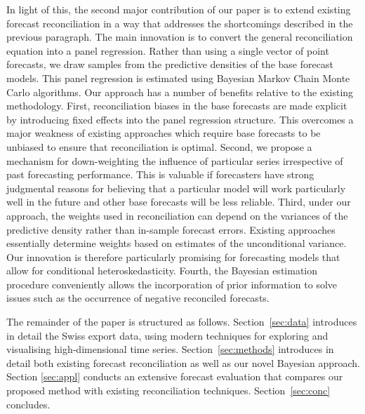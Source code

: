 \documentclass[a4paper,fleqn,11pt]{article}
\begin{document}
In light of this, the second major contribution of our paper is to extend existing forecast reconciliation in a way that addresses the shortcomings described in the previous paragraph. The main innovation is to convert the general reconciliation equation into a panel regression. Rather than using a single vector of point forecasts, we draw samples from the predictive densities of the base forecast models. This panel regression is estimated using Bayesian Markov Chain Monte Carlo algorithms. Our approach has a number of benefits relative to the existing methodology. First, reconciliation biases in the base forecasts are made explicit by introducing fixed effects into the panel regression structure. This overcomes a major weakness of existing approaches which require base forecasts to be unbiased to ensure that reconciliation is optimal. Second, we propose a mechanism for down-weighting the influence of particular series irrespective of past forecasting performance. This is valuable if forecasters have strong judgmental reasons for believing that a particular model will work particularly well in the future and other base forecasts will be less reliable. Third, under our approach, the weights used in reconciliation can depend on the variances of the predictive density rather than in-sample forecast errors. Existing approaches essentially determine weights based on estimates of the unconditional variance. Our innovation is therefore particularly promising for forecasting models that allow for conditional heteroskedasticity. Fourth, the Bayesian estimation procedure conveniently allows the incorporation of prior information to solve issues such as the occurrence of negative reconciled forecasts. 

The remainder of the paper is structured as follows. Section~\ref{sec:data} introduces in detail the Swiss export data, using modern techniques for exploring and visualising high-dimensional time series.  Section~\ref{sec:methods} introduces in detail both existing forecast reconciliation as well as our novel Bayesian approach.  Section \ref{sec:appl} conducts an extensive forecast evaluation that compares our proposed method with existing reconciliation techniques. Section~\ref{sec:conc} concludes.

\clearpage
\end{document}
